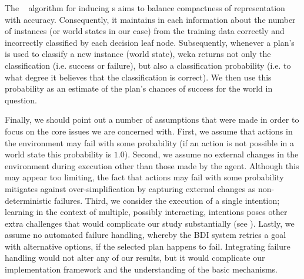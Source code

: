 The \weka\  algorithm for inducing {\dt}s aims to balance compactness of representation with accuracy. Consequently, it maintains in each \dt information about the number of instances (or world states in our case) from the training data correctly and incorrectly classified by each decision leaf node. Subsequently, whenever a plan's \dt is used to classify a new instance (world state), weka returns not only the classification (i.e. success or failure), but also a classification probability (i.e. to what degree it believes that the classification is correct). We then use this probability as an estimate of the plan's chances of success for the world in question.


Finally, we should point out a number of assumptions that were made in order to
focus on the core issues we are concerned with.
First, we assume that actions in the environment may fail with some probability
(if an action is not possible in a world state this probability is $1.0$).
Second, we assume no external changes in the environment during execution other
than those made by the agent. Although this may appear too limiting, the fact
that actions may fail with some probability mitigates against
over-simplification by capturing external changes as
non-deterministic failures.
Third, we consider the execution of a single intention; learning in the context
of multiple, possibly interacting, intentions poses other extra challenges that
would complicate our study substantially (see \cite{Thangarajah02}).
Lastly, we assume no automated failure handling, whereby the BDI system retries
a goal with alternative options, if the selected plan happens to fail. 
Integrating failure handling would not alter any of our results, but it would
complicate our implementation framework and the understanding of the basic
mechanisms.



